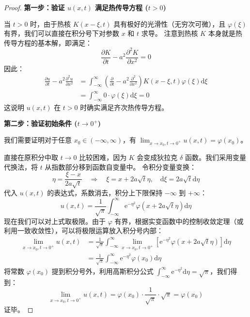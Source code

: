 \documentclass[12pt,a4paper]{ctexart}
\begin{document}
	\begin{proof}
		\textbf{第一步：验证 $u(x,t)$ 满足热传导方程 ($t>0$)}
		
		当 $t>0$ 时，由于热核 $K(x-\xi, t)$ 具有极好的光滑性（无穷次可微），且 $\varphi(\xi)$ 有界，我们可以直接在积分号下对参数 $x$ 和 $t$ 求导。
		注意到热核 $K$ 本身就是热传导方程的基本解，即满足：
		\[
		\frac{\partial K}{\partial t} - a^2 \frac{\partial^2 K}{\partial x^2} = 0
		\]
		因此：
		\begin{align*}
			\frac{\partial u}{\partial t} - a^2 \frac{\partial^2 u}{\partial x^2} &= \int_{-\infty}^{\infty} \left( \frac{\partial}{\partial t} - a^2 \frac{\partial^2}{\partial x^2} \right) K(x-\xi, t) \varphi(\xi) \mathrm{d}\xi \\
			&= \int_{-\infty}^{\infty} 0 \cdot \varphi(\xi) \mathrm{d}\xi = 0
		\end{align*}
		这说明 $u(x,t)$ 在 $t>0$ 时确实满足齐次热传导方程。
		
		\vspace{0.5em}
		
		\textbf{第二步：验证初始条件 ($t \to 0^+$)}
		
		我们需要证明对于任意 $x_0 \in (-\infty, \infty)$，有 $\lim_{x \to x_0, t \to 0^+} u(x,t) = \varphi(x_0)$。
		
		直接在原积分中取 $t \to 0$ 比较困难，因为 $K$ 会变成狄拉克 $\delta$ 函数。我们采用变量代换法，将 $t$ 从指数部分移到函数自变量中。
		令积分变量变换：
		\[
		\eta = \frac{\xi - x}{2a\sqrt{t}} \quad \Rightarrow \quad \xi = x + 2a\sqrt{t}\eta, \quad \mathrm{d}\xi = 2a\sqrt{t}\mathrm{d}\eta
		\]
		代入 $u(x,t)$ 的表达式，系数消去，积分上下限保持 $-\infty$ 到 $+\infty$：
		\begin{equation}
			u(x,t) = \frac{1}{\sqrt{\pi}} \int_{-\infty}^{\infty} \mathrm{e}^{-\eta^2} \varphi(x + 2a\sqrt{t}\eta) \mathrm{d}\eta
		\end{equation}
		现在我们可以对上式取极限。由于 $\varphi$ 有界，根据实变函数中的控制收敛定理（或利用一致收敛性），可以将极限运算放入积分号内部：
		\begin{align*}
			\lim_{x \to x_0, t \to 0^+} u(x,t) &= \frac{1}{\sqrt{\pi}} \int_{-\infty}^{\infty} \lim_{x \to x_0, t \to 0^+} \left[ \mathrm{e}^{-\eta^2} \varphi(x + 2a\sqrt{t}\eta) \right] \mathrm{d}\eta \\
			&= \frac{1}{\sqrt{\pi}} \int_{-\infty}^{\infty} \mathrm{e}^{-\eta^2} \varphi(x_0) \mathrm{d}\eta
		\end{align*}
		将常数 $\varphi(x_0)$ 提到积分号外，利用高斯积分公式 $\int_{-\infty}^{\infty} \mathrm{e}^{-\eta^2} \mathrm{d}\eta = \sqrt{\pi}$，我们得到：
		\[
		\lim_{x \to x_0, t \to 0^+} u(x,t) = \varphi(x_0) \cdot \frac{1}{\sqrt{\pi}} \cdot \sqrt{\pi} = \varphi(x_0)
		\]
		证毕。
	\end{proof}
	
	
\end{document}
